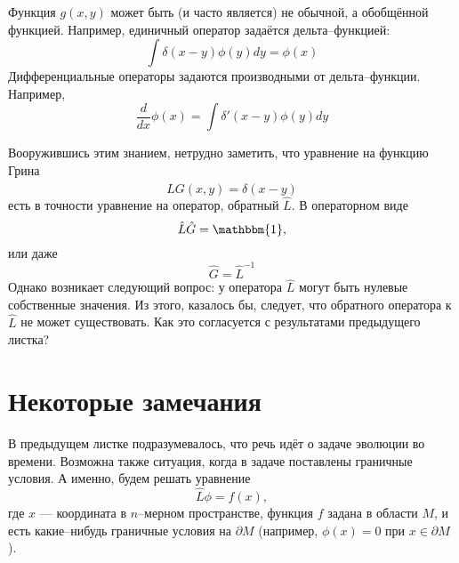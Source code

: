 \documentclass{article}
\begin{document}
Функция $g(x,y)$ может быть (и часто является) не обычной, а обобщённой функцией. Например,
единичный оператор задаётся дельта--функцией:
\begin{equation}
    \int \delta(x-y) \phi(y) dy = \phi(x)
\end{equation}
Дифференциальные операторы задаются производными от дельта--функции. Например,
\begin{equation}
    \frac{d}{dx} \phi(x) = \int \delta'(x-y) \phi(y) dy
\end{equation}

Вооружившись этим знанием, нетрудно заметить, что уравнение на функцию Грина
\begin{equation}
    \hat{L}G(x,y) = \delta(x-y)
\end{equation}
есть в точности уравнение на оператор, обратный $\hat{L}$. В операторном виде
\begin{equation}
    \hat{L} \hat{G} = \mathbbm{1},
\end{equation}
или даже 
\begin{equation}
    \hat{G} = \hat{L}^{-1}
\end{equation}
Однако возникает следующий вопрос: у оператора $\hat{L}$ могут быть нулевые собственные 
значения. Из этого, казалось бы, следует, что обратного оператора к $\hat{L}$ не может
существовать. Как это согласуется с результатами предыдущего листка?



\section{Некоторые замечания}
В предыдущем листке подразумевалось, что речь идёт о задаче эволюции во времени. 
Возможна также ситуация, когда в задаче поставлены граничные условия. А именно, будем решать
уравнение 
\begin{equation}
    \hat{L}\phi = f(x),
\end{equation}
где $x$ --- координата в $n$--мерном пространстве, функция $f$ задана в области
$M$, и есть какие--нибудь граничные условия на $\partial M$ 
(например, $\phi(x) = 0$ при $x \in \partial M$). 
\end{document}
